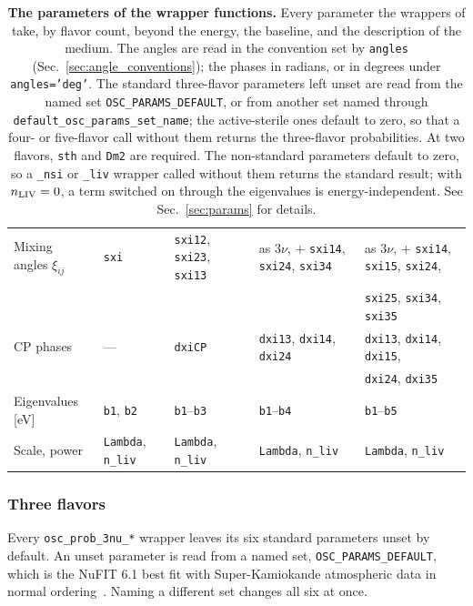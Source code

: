 \begin{table}[t!]
\begin{tabular}{l l l l l}
Mixing angles $\xi_{ij}$ & {\tt sxi} & {\tt sxi12}, {\tt sxi23}, {\tt sxi13} & as 3$\nu$, $+$ {\tt sxi14}, {\tt sxi24}, {\tt sxi34} & as 3$\nu$, $+$ {\tt sxi14}, {\tt sxi15}, {\tt sxi24}, \\
 & & & & {\tt sxi25}, {\tt sxi34}, {\tt sxi35} \\
CP phases & --- & {\tt dxiCP} & {\tt dxi13}, {\tt dxi14}, {\tt dxi24} & {\tt dxi13}, {\tt dxi14}, {\tt dxi15}, \\
 & & & & {\tt dxi24}, {\tt dxi35} \\
Eigenvalues [eV] & {\tt b1}, {\tt b2} & {\tt b1}--{\tt b3} & {\tt b1}--{\tt b4} & {\tt b1}--{\tt b5} \\
Scale, power & {\tt Lambda}, {\tt n\_liv} & {\tt Lambda}, {\tt n\_liv} & {\tt Lambda}, {\tt n\_liv} & {\tt Lambda}, {\tt n\_liv} \\
\hline
\end{tabular}
\caption{\label{tab:parameters}\textbf{The parameters of the wrapper functions.} Every parameter the wrappers of  take, by flavor count, beyond the energy, the baseline, and the description of the medium. The angles are read in the convention set by {\tt angles} (Sec.~\ref{sec:angle_conventions}); the phases in radians, or in degrees under {\tt angles='deg'}. The standard three-flavor parameters left unset are read from the named set {\tt OSC\_PARAMS\_DEFAULT}, or from another set named through {\tt default\_osc\_params\_set\_name}; the active-sterile ones default to zero, so that a four- or five-flavor call without them returns the three-flavor probabilities. At two flavors, {\tt sth} and {\tt Dm2} are required. The non-standard parameters default to zero, so a {\tt \_nsi} or {\tt \_liv} wrapper called without them returns the standard result; with $n_{\rm LIV} = 0$, a term switched on through the eigenvalues is energy-independent. See Sec.~\ref{sec:params} for details.}
\end{table}


\subsubsection{Three flavors}

Every {\tt osc\_prob\_3nu\_*} wrapper leaves its six standard parameters unset by default. An unset parameter is read from a named set, {\tt OSC\_PARAMS\_DEFAULT}, which is the NuFIT 6.1 best fit with Super-Kamiokande atmospheric data in normal ordering\ \cite{Esteban:2024eli}. Naming a different set changes all six at once.

